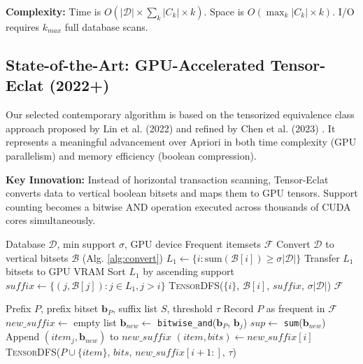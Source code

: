 \documentclass[conference]{IEEEtran}
\begin{document}
\textbf{Complexity:} Time is $O(|\mathcal{D}| \times \sum_k |C_k| \times k)$. Space is $O(\max_k |C_k| \times k)$. I/O requires $k_{max}$ full database scans.

\subsection{State-of-the-Art: GPU-Accelerated Tensor-Eclat (2022+)}
Our selected contemporary algorithm is based on the tensorized equivalence class approach proposed by Lin et al. (2022) \cite{sota2022tensor} and refined by Chen et al. (2023) \cite{gpu2023fim}. It represents a meaningful advancement over Apriori in both time complexity (GPU parallelism) and memory efficiency (boolean compression).

\textbf{Key Innovation:} Instead of horizontal transaction scanning, Tensor-Eclat converts data to vertical boolean bitsets and maps them to GPU tensors. Support counting becomes a bitwise AND operation executed across thousands of CUDA cores simultaneously.

\begin{algorithm}[htbp]
\caption{GPU Tensor-Eclat (State-of-the-Art)}
\label{alg:tensor_eclat}
\begin{algorithmic}[1]
\REQUIRE Database $\mathcal{D}$, min support $\sigma$, GPU device
\ENSURE Frequent itemsets $\mathcal{F}$
\STATE Convert $\mathcal{D}$ to vertical bitsets $\mathcal{B}$ (Alg. \ref{alg:convert})
\STATE $L_1 \leftarrow \{i : \text{sum}(\mathcal{B}[i]) \geq \sigma|\mathcal{D}|\}$
\STATE Transfer $L_1$ bitsets to GPU VRAM
\STATE Sort $L_1$ by ascending support
    \STATE $suffix \leftarrow \{(j, \mathcal{B}[j]) : j \in L_1, j > i\}$
    \STATE \textsc{TensorDFS}($\{i\}$, $\mathcal{B}[i]$, $suffix$, $\sigma|\mathcal{D}|$)
\ENDFOR
\RETURN $\mathcal{F}$
\end{algorithmic}
\end{algorithm}

\begin{algorithm}[htbp]
\caption{TensorDFS (GPU-Parallel Depth-First Mining)}
\label{alg:tensordfs}
\begin{algorithmic}[1]
\REQUIRE Prefix $P$, prefix bitset $\mathbf{b}_P$, suffix list $S$, threshold $\tau$
\STATE Record $P$ as frequent in $\mathcal{F}$
\STATE $new\_suffix \leftarrow$ empty list
    \STATE $\mathbf{b}_{new} \leftarrow$ \texttt{bitwise\_and}($\mathbf{b}_P$, $\mathbf{b}_j$) 
    \STATE $sup \leftarrow$ \texttt{sum}($\mathbf{b}_{new}$) 
        \STATE Append $(item_j, \mathbf{b}_{new})$ to $new\_suffix$
    \ENDIF
\ENDFOR
{}
    \STATE $(item, bits) \leftarrow new\_suffix[i]$
    \STATE \textsc{TensorDFS}($P \cup \{item\}$, $bits$, $new\_suffix[i{+}1:]$, $\tau$)
\ENDFOR
\end{algorithmic}
\end{algorithm}
\end{document}
